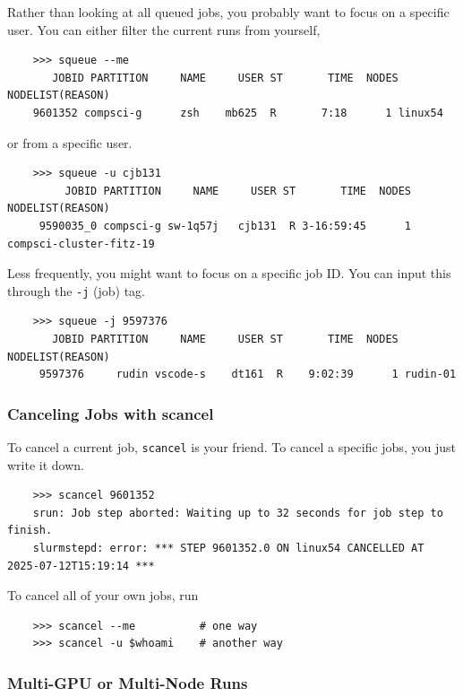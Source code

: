   Rather than looking at all queued jobs, you probably want to focus on a specific user. You can either filter the current runs from yourself, 

  \begin{lstlisting}
    >>> squeue --me      
       JOBID PARTITION     NAME     USER ST       TIME  NODES NODELIST(REASON)
    9601352 compsci-g      zsh    mb625  R       7:18      1 linux54 
  \end{lstlisting}

  or from a specific user. 

  \begin{lstlisting}
    >>> squeue -u cjb131
         JOBID PARTITION     NAME     USER ST       TIME  NODES NODELIST(REASON)
     9590035_0 compsci-g sw-1q57j   cjb131  R 3-16:59:45      1 compsci-cluster-fitz-19 
  \end{lstlisting} 

  Less frequently, you might want to focus on a specific job ID. You can input this through the \texttt{-j} (job) tag. 

  \begin{lstlisting}
    >>> squeue -j 9597376
       JOBID PARTITION     NAME     USER ST       TIME  NODES NODELIST(REASON)
     9597376     rudin vscode-s    dt161  R    9:02:39      1 rudin-01 
  \end{lstlisting}
  
\subsubsection{Canceling Jobs with scancel}

  To cancel a current job, \texttt{scancel} is your friend. To cancel a specific jobs, you just write it down. 

  \begin{lstlisting}
    >>> scancel 9601352   
    srun: Job step aborted: Waiting up to 32 seconds for job step to finish.
    slurmstepd: error: *** STEP 9601352.0 ON linux54 CANCELLED AT 2025-07-12T15:19:14 ***   
  \end{lstlisting}

  To cancel all of your own jobs, run 
  \begin{lstlisting}
    >>> scancel --me          # one way
    >>> scancel -u $whoami    # another way
  \end{lstlisting} 

\subsubsection{Multi-GPU or Multi-Node Runs}
